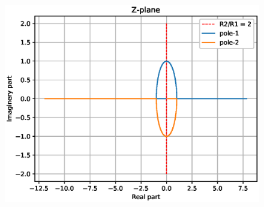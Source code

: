 \begin{enumerate}[label=\thesubsection.\arabic*.,ref=\thesubsection.\theenumi]
\begin{figure}[!ht]
\centering
\includegraphics[width=\columnwidth]{./figs/ee18btech11044/ee18btech11044_3_1.eps}
\caption{}
\end{figure}




\end{enumerate}
